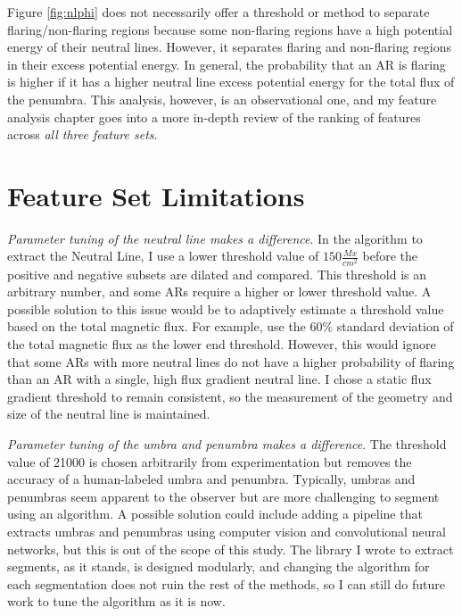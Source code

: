 \documentclass[defaultstyle,11pt]{thesis}
\begin{document}
Figure \ref{fig:nlphi} does not necessarily offer a threshold or method to separate flaring/non-flaring regions because some non-flaring regions have a high potential energy of their neutral lines. However, it separates flaring and non-flaring regions in their excess potential energy. In general, the probability that an AR is flaring is higher if it has a higher neutral line excess potential energy for the total flux of the penumbra. This analysis, however, is an observational one, and my feature analysis chapter goes into a more in-depth review of the ranking of features across \textit{all three feature sets}.

\section{Feature Set Limitations} \label{sec:limitations}
\textit{Parameter tuning of the neutral line makes a difference}. In the algorithm to extract the Neutral Line, I use a lower threshold value of $150 \frac{Mx}{cm^2}$ before the positive and negative subsets are dilated and compared. This threshold is an arbitrary number, and some ARs require a higher or lower threshold value. A possible solution to this issue would be to adaptively estimate a threshold value based on the total magnetic flux. For example, use the $60\%$ standard deviation of the total magnetic flux as the lower end threshold. However, this would ignore that some ARs with more neutral lines do not have a higher probability of flaring than an AR with a single, high flux gradient neutral line. I chose a static flux gradient threshold to remain consistent, so the measurement of the geometry and size of the neutral line is maintained. 

\textit{Parameter tuning of the umbra and penumbra makes a difference}. The threshold value of 21000 is chosen arbitrarily from experimentation but removes the accuracy of a human-labeled umbra and penumbra. Typically, umbras and penumbras seem apparent to the observer but are more challenging to segment using an algorithm. A possible solution could include adding a pipeline that extracts umbras and penumbras using computer vision and convolutional neural networks, but this is out of the scope of this study. The library I wrote to extract segments, as it stands, is designed modularly, and changing the algorithm for each segmentation does not ruin the rest of the methods, so I can still do future work to tune the algorithm as it is now.
\end{document}
